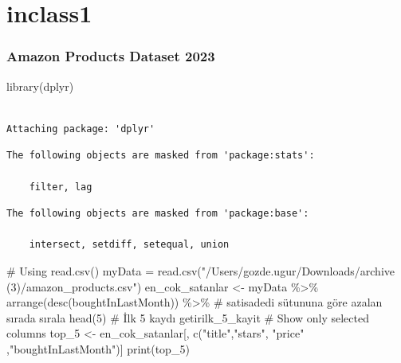 \documentclass[
  letterpaper,
  DIV=11,
  numbers=noendperiod]{scrreprt}
\newenvironment{Shaded}{\begin{snugshade}}{\end{snugshade}}
\newcommand{\CommentTok}[1]{\textcolor[rgb]{0.37,0.37,0.37}{#1}}
\newcommand{\DecValTok}[1]{\textcolor[rgb]{0.68,0.00,0.00}{#1}}
\newcommand{\FunctionTok}[1]{\textcolor[rgb]{0.28,0.35,0.67}{#1}}
\newcommand{\NormalTok}[1]{\textcolor[rgb]{0.00,0.23,0.31}{#1}}
\newcommand{\OtherTok}[1]{\textcolor[rgb]{0.00,0.23,0.31}{#1}}
\newcommand{\SpecialCharTok}[1]{\textcolor[rgb]{0.37,0.37,0.37}{#1}}
\newcommand{\StringTok}[1]{\textcolor[rgb]{0.13,0.47,0.30}{#1}}
\begin{document}

\hypertarget{inclass1}{%
\chapter{inclass1}\label{inclass1}}

\hypertarget{amazon-products-dataset-2023-1}{%
\subsection{Amazon Products Dataset
2023}\label{amazon-products-dataset-2023-1}}

\begin{Shaded}
\begin{Highlighting}[]
\FunctionTok{library}\NormalTok{(dplyr)}
\end{Highlighting}
\end{Shaded}

\begin{verbatim}

Attaching package: 'dplyr'
\end{verbatim}

\begin{verbatim}
The following objects are masked from 'package:stats':

    filter, lag
\end{verbatim}

\begin{verbatim}
The following objects are masked from 'package:base':

    intersect, setdiff, setequal, union
\end{verbatim}

\begin{Shaded}
\begin{Highlighting}[]
\CommentTok{\# Using read.csv()}
\NormalTok{myData }\OtherTok{=} \FunctionTok{read.csv}\NormalTok{(}\StringTok{"/Users/gozde.ugur/Downloads/archive (3)/amazon\_products.csv"}\NormalTok{) }
\NormalTok{en\_cok\_satanlar }\OtherTok{\textless{}{-}}\NormalTok{ myData }\SpecialCharTok{\%\textgreater{}\%} 
  \FunctionTok{arrange}\NormalTok{(}\FunctionTok{desc}\NormalTok{(boughtInLastMonth)) }\SpecialCharTok{\%\textgreater{}\%}  \CommentTok{\# satisadedi sütununa göre azalan sırada sırala}
  \FunctionTok{head}\NormalTok{(}\DecValTok{5}\NormalTok{)  }\CommentTok{\# İlk 5 kaydı getirilk\_5\_kayit }
\CommentTok{\# Show only selected columns}
\NormalTok{top\_5 }\OtherTok{\textless{}{-}}\NormalTok{ en\_cok\_satanlar[, }\FunctionTok{c}\NormalTok{(}\StringTok{"title"}\NormalTok{,}\StringTok{"stars"}\NormalTok{, }\StringTok{"price"}\NormalTok{ ,}\StringTok{"boughtInLastMonth"}\NormalTok{)]}
\FunctionTok{print}\NormalTok{(top\_5)}
\end{Highlighting}
\end{Shaded}
\end{document}
